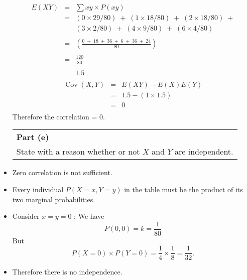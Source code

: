 \documentclass[a4paper,12pt]{article}
\begin{document}
\begin{itemize}
		\begin{eqnarray*}
			E(XY) &=& \sum xy \times P(xy) \\
			&=& \left( 0 \times 29/80 \right) \; + \; \left( 1 \times  18/80 \right) \; + \; \left( 2 \times  18/80 \right) \; + \\
			& & \left( 3 \times  2/80 \right) \; + \; \left( 4 \times  9/80 \right) \; + \; \left( 6 \times   4/80 \right) \\
			& &\\ &=& \left( \frac{0 \;+\; 18 \;+\; 36  \;+\; 6 \;+\; 36  \;+\; 24  }{80} \right)\\
			& &\\&=& \frac{120}{80}\\
			& &\\&=& 1.5\\
		\end{eqnarray*}
		\begin{eqnarray*}\operatorname{Cov}( X,Y ) 
			&=& E(XY) - E(X )E(Y ) \\
			&=& 1.5 -( 1 \times 1.5)\\
			&=& 0 \\
		\end{eqnarray*}
		Therefore the correlation = 0.
		
		\newpage
		\large
		
		
		\begin{table}[ht!]
			\centering
			\begin{tabular}{|p{15cm}|}
				\hline  \large
				\noindent \textbf{Part (e)} \\ \large State with a reason whether or not $X$ and $Y$ are independent.
				\\ \hline
			\end{tabular}
		\end{table}
		\item Zero correlation is not sufficient. 
		\item Every individual $P( X = x, Y = y)$ in the
		table must be the product of its two marginal probabilities.
		\item Consider $x = y = 0$ ; We have 
		\[ P(0,0) = k = \frac{1}{80} \] 
		But \[P(X =0) \times P(Y=0)  = \frac{1}{4} \times \frac{1}{8} = \frac{1}{32}.\] 
		\item Therefore there is no independence.
	\end{itemize}
\end{document}
